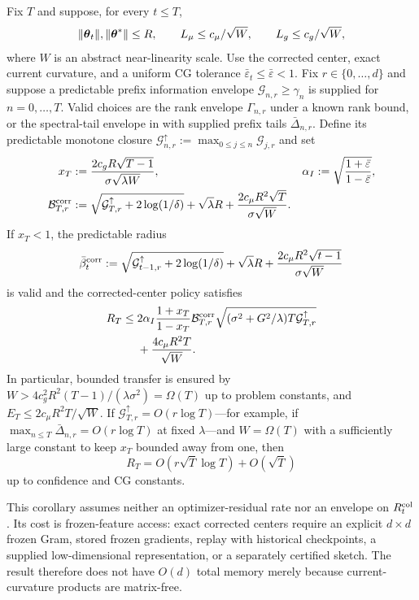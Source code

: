 \begin{corollary}
\label{cor:corrected-near-linear}
Fix $T$ and suppose, for every $t\le T$,
\[
 \|\boldsymbol{\theta}_t\|,\|\boldsymbol{\theta}^*\|\le R,\qquad
 L_\mu\le c_\mu/\sqrt W,\qquad L_g\le c_g/\sqrt W,
\]
where $W$ is an abstract near-linearity scale.  Use the corrected center,
exact current curvature, and a uniform CG tolerance
$\bar\varepsilon_t\le\bar\varepsilon<1$.  Fix
$r\in\{0,\ldots,d\}$ and suppose a predictable prefix information envelope
$\mathcal G_{n,r}\ge\gamma_n$ is supplied for $n=0,\ldots,T$.  Valid choices
are the rank envelope $\Gamma_{n,r}$ under a known rank bound, or the
spectral-tail envelope in  with supplied
prefix tails $\bar\Delta_{n,r}$.  Define its predictable monotone closure
$\mathcal G^\uparrow_{n,r}:=\max_{0\le j\le n}\mathcal G_{j,r}$ and set
\begin{align*}
 x_T&:=\frac{2c_gR\sqrt{T-1}}{\sigma\sqrt{\lambda W}},&
 \alpha_I&:=\sqrt{\frac{1+\bar\varepsilon}{1-\bar\varepsilon}},\\
 \mathcal B_{T,r}^{\rm corr}
 &:=\sqrt{\mathcal G^\uparrow_{T,r}+2\log(1/\delta)}+\sqrt\lambda R
 +\frac{2c_\mu R^2\sqrt T}{\sigma\sqrt W}.&&
\end{align*}
If $x_T<1$, the predictable radius
\begin{equation}\label{eq:corrected-near-linear-beta}
 \bar\beta_t^{\rm corr}:=
 \sqrt{\mathcal G^\uparrow_{t-1,r}+2\log(1/\delta)}+\sqrt\lambda R
 +\frac{2c_\mu R^2\sqrt{t-1}}{\sigma\sqrt W}
\end{equation}
is valid and the corrected-center policy satisfies
\begin{equation}\label{eq:corrected-near-linear-regret}
\begin{aligned}
 R_T\le{}&2\alpha_I\frac{1+x_T}{1-x_T}
 \mathcal B_{T,r}^{\rm corr}
 \sqrt{(\sigma^2+G^2/\lambda)T\mathcal G^\uparrow_{T,r}}\\
 &+\frac{4c_\mu R^2T}{\sqrt W}.
\end{aligned}
\end{equation}
In particular, bounded transfer is ensured by
$W>4c_g^2R^2(T-1)/(\lambda\sigma^2)=\Omega(T)$ up to problem constants,
and $E_T\le2c_\mu R^2T/\sqrt W$.  If
$\mathcal G^\uparrow_{T,r}=O(r\log T)$---for example, if
$\max_{n\le T}\bar\Delta_{n,r}=O(r\log T)$ at fixed $\lambda$---and
$W=\Omega(T)$ with
a sufficiently large constant to keep $x_T$ bounded away from one, then
\[
 R_T=O(r\sqrt T\log T)+O(\sqrt T)
\]
up to confidence and CG constants.

This corollary assumes neither an optimizer-residual rate nor an envelope on
$R_t^{\rm col}$.  Its cost is frozen-feature access: exact corrected centers
require an explicit $d\times d$ frozen Gram, stored frozen gradients, replay
with historical checkpoints, a supplied low-dimensional representation, or a
separately certified sketch.  The result therefore does not have $O(d)$ total
memory merely because current-curvature products are matrix-free.
\end{corollary}
